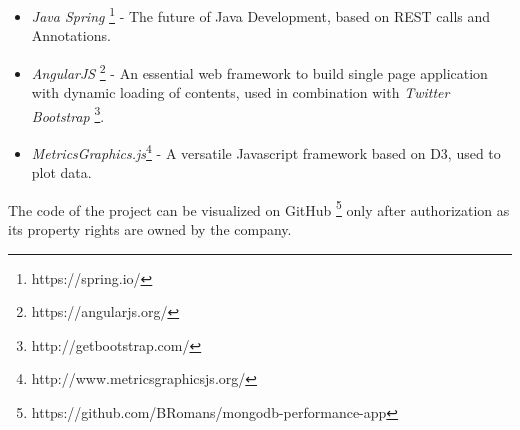 \begin{itemize}
    \item \textit{Java Spring} \footnote{https://spring.io/} - The future of Java Development, based on REST calls and Annotations.
    \item \textit{AngularJS} \footnote{https://angularjs.org/} - An essential web framework to build single page application with dynamic loading of contents, used in combination with \textit{Twitter Bootstrap} \footnote{http://getbootstrap.com/}.
    \item \textit{MetricsGraphics.js}\footnote{http://www.metricsgraphicsjs.org/} - A versatile Javascript framework based on D3, used to plot data.
\end{itemize}
The code of the project can be visualized on GitHub \footnote{https://github.com/BRomans/mongodb-performance-app} only after authorization as its property rights are owned by the company.




